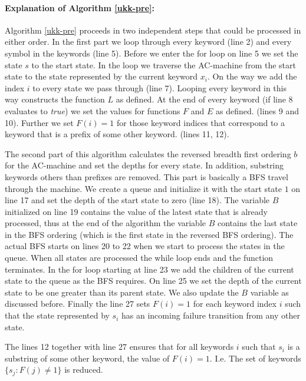 \documentclass[english,twoside,censored,csm,algorithms-track-2020]{HYthesisML}
\theoremstyle{plain}
\theoremstyle{definition}
\begin{document}
\paragraph{Explanation of Algorithm \ref{ukk-pre}:}  
Algorithm \ref{ukk-pre} proceeds in two independent steps that could be processed in either order.
In the first part we loop through every keyword (line 2) and every symbol in the keywords (line 5).
Before we enter the for loop on line 5 we set the state $s$ to the start state. In the loop
we traverse the AC-machine from the start state to the state represented by the current keyword $x_i$.
On the way we add the index $i$ to every state we pass through (line 7). Looping every keyword in this
way constructs the function $L$ as defined. At the end of every keyword (if line 8 evaluates to
\textit{true}) we set the values for functions $F$ and $E$ as defined. (lines 9 and 10).
Further we set $F(i) = 1$ for those keyword indices that correspond to a keyword that is a prefix
of some other keyword. (lines 11, 12).

The second part of this algorithm calculates the reversed breadth first ordering $b$ for the
AC-machine and set the depths for every state. In addition, substring keywords others than
prefixes are removed. This part is basically a BFS travel through the machine. We create a queue
and initialize it with the start state $1$ on line 17 and set the depth of the start state to
zero (line 18). The variable $B$ initialized on line 19 contains the value of the latest state
that is already processed, thus at the end of the algorithm the variable $B$ contains the last state
in the BFS ordering (which is the first state in the reversed BFS ordering). The actual BFS starts
on lines 20 to 22 when we start to process the states in the queue. When all states are processed
the while loop ends and the function terminates. In the for loop starting at line 23 we add the
children of the current state to the queue as the BFS requires. On line 25 we set the depth
of the current state to be one greater than its parent state. We also update the $B$ variable
as discussed before. Finally the line 27 sets $F(i) = 1$ for each keyword index $i$ such that
the state represented by $s_i$ has an incoming failure transition from any other state.

The lines 12 together with line 27 ensures that for all keywords $i$ such that $s_i$ is a substring
of some other keyword, the value of $F(i)=1$. I.e. The set of keywords $\{s_j : F(j) \neq 1\}$ is
reduced.
\end{document}

